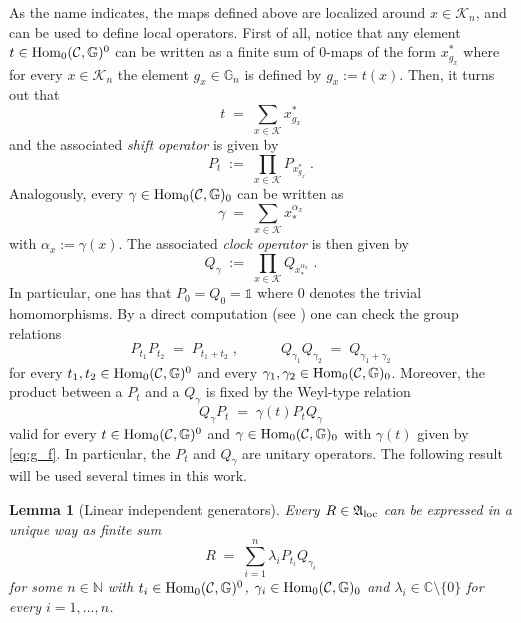 \documentclass[a4paper,12pt,twoside,reqno]{amsart}
\theoremstyle{plain}
\newtheorem{lemma}[teo]{Lemma}
\theoremstyle{definition}
\theoremstyle{remark}
\numberwithin{equation}{section}
\numberwithin{figure}{section}
\numberwithin{table}{section}
\newcommand{\f}[1]{\mathcal{#1}}
\newcommand{\n}[1]{\mathbb{#1}}
\begin{document}
	
	
	
	
	
	
	
	
	\medskip
	
	
	
	
	
	
	
	
	
	As the name indicates, the maps defined above are localized around $x\in \f{K}_n$, and can be used to define local operators.
	First of all, notice that any element $t\in {\rm Hom}_0(\f{C},\n{G})^0$ can be written as a finite sum of $0$-maps of the form $x^*_{g_x}$ where for every $x\in \f{K}_n$ the 
	element  $g_x\in \n{G}_n$ is defined by $g_x:=t(x)$. Then, it turns out that
	\begin{equation*}
		t\;=\;\sum_{x\in \f{K}} x^*_{g_x}
	\end{equation*}
	and the associated \textit{shift  operator} is given by
	$$P_t\;:=\;\prod_{x\in \f{K}}P_{ x^*_{g_x}}\;.
	$$
	Analogously, every $\gamma\in {\rm Hom}_0(\f{C},\n{G})_0$ can be  written as 
	\begin{equation*}
		\gamma\;=\;\sum_{x\in \f{K}} x_*^{\alpha_x}
	\end{equation*}
	with $\alpha_x:=\gamma(x)$. The associated \textit{clock  operator} is then given by
	$$
	Q_\gamma\;:=\;\prod_{x\in \f{K}} Q_{x_*^{\alpha_x}}\;.
	$$
	In particular, one has that $P_0=Q_0=\n{1}$ where   $0$ denotes the trivial homomorphisms. 
	By a direct computation (see \cite[Appendix D]{dealmeida2017topological}) one can check the group relations
	\begin{equation}\label{relatP-Q}
		P_{t_1}P_{t_2}\;=\;P_{t_1+t_2}\;,\qquad\quad Q_{\gamma_1}Q_{\gamma_2}\;=\;Q_{\gamma_1+\gamma_2}
	\end{equation}
	for every $t_1,t_2\in {\rm Hom}_0(\f{C},\n{G})^0$ and every $\gamma_1,\gamma_2\in {\rm Hom}_0(\f{C},\n{G})_0$. Moreover, the product between a $P_t$ and a $Q_\gamma$ is fixed by the  Weyl-type 
	relation
	\begin{equation}\label{eq:commutation_P_and_Q}
		Q_\gamma P_t\;=\;\gamma(t)P_tQ_\gamma
	\end{equation}
	valid for every $t\in {\rm Hom}_0(\f{C},\n{G})^0$ and $\gamma\in {\rm Hom}_0(\f{C},\n{G})_0$
	with $\gamma(t)$ given by \eqref{eq:g_f}.
	In particular, the $P_t$ and $Q_\gamma$ are unitary operators.
	The following result will be used several times in this work.
	\begin{lemma}[Linear independent generators]\label{lemm:lin_indip_g}
		Every $R\in \mathfrak{A}_{\rm loc}$ can be expressed in a unique way as finite sum
		\[
		R\;=\;\sum_{i=1}^n\lambda_{i}P_{t_i}Q_{\gamma_i}
		\]
		for some $n\in\n{N}$ with $t_i\in {\rm Hom}_0(\f{C},\n{G})^0$, $\gamma_i\in {\rm Hom}_0(\f{C},\n{G})_0$ and $\lambda_i\in\n{C}\setminus\{0\}$ for every $i=1,\ldots,n$.
	\end{lemma}
\end{document}
